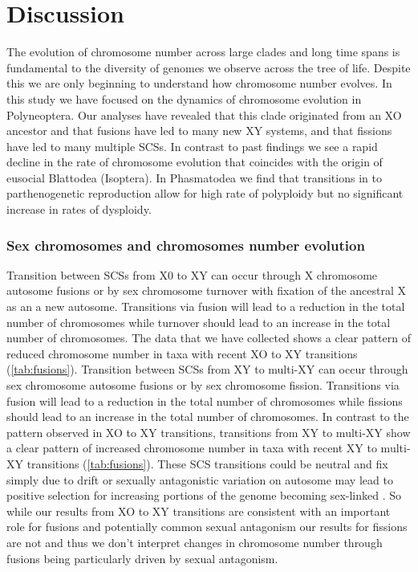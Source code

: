 \section{Discussion}

The evolution of chromosome number across large clades and long time spans is fundamental to the diversity of genomes we observe across the tree of life.
Despite this we are only beginning to understand how chromosome number evolves.
In this study we have focused on the dynamics of chromosome evolution in Polyneoptera. 
Our analyses have revealed that this clade originated from an XO ancestor and that fusions have led to many new XY systems, and that fissions have led to many multiple SCSs.
In contrast to past findings \citep{ross2015} we see a rapid decline in the rate of chromosome evolution that coincides with the origin of eusocial Blattodea (Isoptera).
In Phasmatodea we find that transitions in to parthenogenetic reproduction allow for high rate of polyploidy but no significant increase in rates of dysploidy.

\subsubsection{Sex chromosomes and chromosomes number evolution}
Transition between SCSs from X0 to XY can occur through X chromosome autosome fusions or by sex chromosome turnover with fixation of the ancestral X as an a new autosome.
Transitions via fusion will lead to a reduction in the total number of chromosomes while turnover should lead to an increase in the total number of chromosomes.
The data that we have collected shows a clear pattern of reduced chromosome number in taxa with recent XO to XY transitions (\cref{tab:fusions}).
Transition between SCSs from XY to multi-XY can occur through sex chromosome autosome fusions or by sex chromosome fission.
Transitions via fusion will lead to a reduction in the total number of chromosomes while fissions should lead to an increase in the total number of chromosomes.
In contrast to the pattern observed in XO to XY transitions, transitions from XY to multi-XY show a clear pattern of increased chromosome number in taxa with recent XY to multi-XY transitions (\cref{tab:fusions}).
These SCS transitions could be neutral and fix simply due to drift or sexually antagonistic variation on autosome may lead to positive selection for increasing portions of the genome becoming sex-linked \citep{charlesworth1980, kitano2012}.
So while our results from XO to XY transitions are consistent with an important role for fusions and potentially common sexual antagonism our results for fissions are not and thus we don't interpret changes in chromosome number through fusions being particularly driven by sexual antagonism. 

